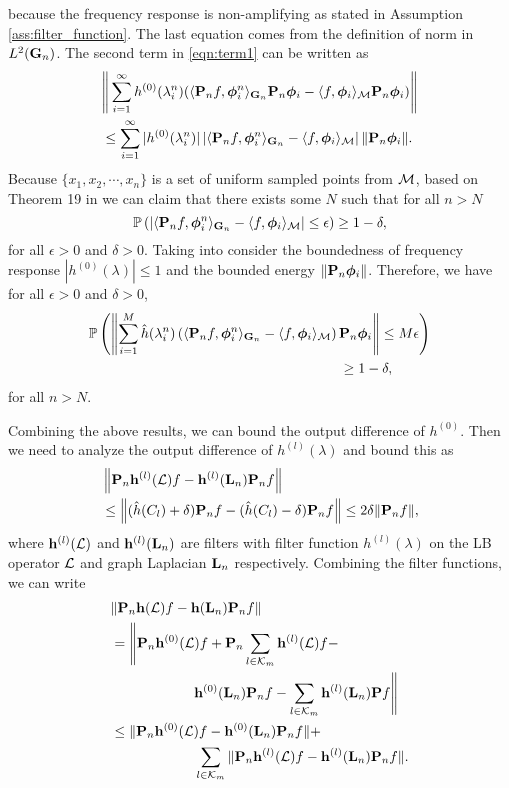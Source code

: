 because the frequency response is non-amplifying as stated in Assumption \ref{ass:filter_function}. The last equation comes from the definition of norm in $L^2({\mathbf G}_n)$.
The second term in \eqref{eqn:term1} can be written as
\begin{align}
     & \nonumber \Bigg\| \sum_{i=1}^\infty  {h}^{(0)}(\lambda_i^n) (\langle {\ensuremath{\mathbf P}}_n f,\bm\phi_i^n\rangle_{{\mathbf G}_n}  {\mathbf P}_n\bm\phi_i -\langle f,\bm\phi_i\rangle_{\mathcal M} {\mathbf P}_n\bm\phi_i ) \Bigg\| \\
   &\leq \sum_{i=1}^\infty |{h}^{(0)}(\lambda_i^n)| \left|\langle {\ensuremath{\mathbf P}}_n f,\bm\phi_i^n\rangle_{{\mathbf G}_n}  -\langle f,\bm\phi_i\rangle_{\mathcal M}\right|\|{\mathbf P}_n\bm\phi_i\|.
\end{align}
Because $\{x_1, x_2,\cdots,x_n\}$ is a set of uniform sampled points from ${\mathcal M}$, based on Theorem 19 in \cite{von2008consistency} we can claim that there exists some $N$ such that for all $n>N$
\begin{equation}
   \mathbb{P}\left(\left|\langle {\ensuremath{\mathbf P}}_n f,\bm\phi_i^n\rangle_{{\mathbf G}_n}  -\langle f,\bm\phi_i\rangle_{\mathcal M}\right|\leq\epsilon \right)\geq 1-\delta,
\end{equation}
for all $\epsilon>0$ and $\delta>0$. Taking into consider the boundedness of frequency response $|{h}^{(0)}(\lambda)|\leq 1$ and the bounded energy $\|{\mathbf P}_n\bm\phi_i\|$. Therefore, we have for all $\epsilon>0$ and $\delta>0$,
\begin{align}
&\nonumber  \mathbb{P}\left(\left\| \sum_{i=1}^M  \hat{h}(\lambda_i^n) \left(\langle {\ensuremath{\mathbf P}}_n f,\bm\phi_i^n\rangle_{{\mathbf G}_n}  -\langle f,\bm\phi_i\rangle_{\mathcal M} \right){\mathbf P}_n\bm\phi_i  \right\|\leq M \epsilon\right)
\\& \qquad \qquad\qquad\qquad\qquad\qquad\qquad\qquad\qquad\geq 1-\delta,
\end{align}
for all $n>N$.

Combining the above results, we can bound the output difference of $h^{(0)}$. Then we need to analyze the output difference of $h^{(l)}(\lambda)$ and bound this as
\begin{align}
    \nonumber &\left\| {\mathbf P}_n {\mathbf h}^{(l)}({\mathcal L})f -{\mathbf h}^{(l)}({\mathbf L}_n){\mathbf P}_n f \right\| 
    \\& \leq \left\| (\hat{h}(C_l)+\delta){\mathbf P}_n f - (\hat{h}(C_l)-\delta){\mathbf P}_nf\right\| \leq 2\delta\|{\mathbf P}_nf\|,
\end{align}
where ${\mathbf h}^{(l)}({\mathcal L})$ and ${\mathbf h}^{(l)}({\mathbf L}_n)$ are filters with filter function $h^{(l)}(\lambda)$ on the LB operator ${\mathcal L}$ and graph Laplacian ${\mathbf L}_n$ respectively.
Combining the filter functions, we can write
\begin{align}
   \nonumber &\|{\mathbf P}_n{\mathbf h}({\mathcal L})f-{\mathbf h}({\mathbf L}_n){\mathbf P}_n f\|\\\nonumber &=
    \Bigg\|{\mathbf P}_n{\mathbf h}^{(0)}({\mathcal L})f +{\mathbf P}_n\sum_{l\in{\ensuremath{\mathcal K}}_m}{\mathbf h}^{(l)}({\mathcal L})f -\\& \qquad \qquad \qquad {\ensuremath{\mathbf h}}^{(0)}({\mathbf L}_n){\mathbf P}_n f - \sum_{l\in{\ensuremath{\mathcal K}}_m} {\mathbf h}^{(l)}({\mathbf L}_n){\mathbf P} f \Bigg\|\\
    &\nonumber \leq \|{\mathbf P}_n {\mathbf h}^{(0)}({\mathcal L})f-{\mathbf h}^{(0)}({\mathbf L}_n){\mathbf P}_n f\|+\\
    &\qquad \qquad \qquad \sum_{l\in{\ensuremath{\mathcal K}}_m}\|{\mathbf P}_n {\mathbf h}^{(l)}({\mathcal L})f-{\mathbf h}^{(l)}({\mathbf L}_n){\mathbf P}_nf\|.
\end{align}


